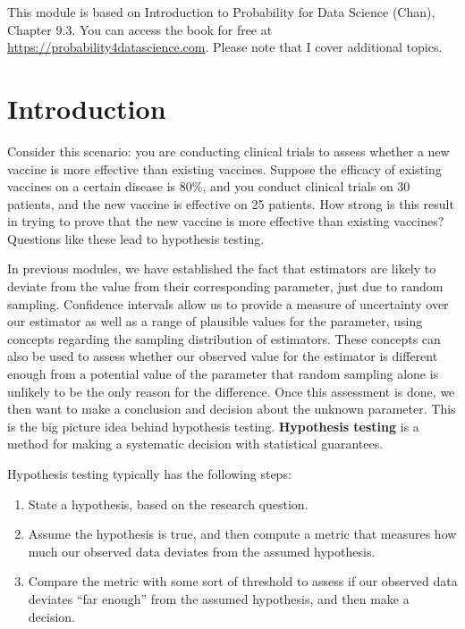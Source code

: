 \documentclass[
]{book}
\providecommand{\tightlist}{%
  \setlength{\itemsep}{0pt}\setlength{\parskip}{0pt}}
\begin{document}
This module is based on Introduction to Probability for Data Science (Chan), Chapter 9.3. You can access the book for free at \url{https://probability4datascience.com}. Please note that I cover additional topics.

\hypertarget{introduction-5}{%
\section{Introduction}\label{introduction-5}}

Consider this scenario: you are conducting clinical trials to assess whether a new vaccine is more effective than existing vaccines. Suppose the efficacy of existing vaccines on a certain disease is 80\%, and you conduct clinical trials on 30 patients, and the new vaccine is effective on 25 patients. How strong is this result in trying to prove that the new vaccine is more effective than existing vaccines? Questions like these lead to hypothesis testing.

In previous modules, we have established the fact that estimators are likely to deviate from the value from their corresponding parameter, just due to random sampling. Confidence intervals allow us to provide a measure of uncertainty over our estimator as well as a range of plausible values for the parameter, using concepts regarding the sampling distribution of estimators. These concepts can also be used to assess whether our observed value for the estimator is different enough from a potential value of the parameter that random sampling alone is unlikely to be the only reason for the difference. Once this assessment is done, we then want to make a conclusion and decision about the unknown parameter. This is the big picture idea behind hypothesis testing. \textbf{Hypothesis testing} is a method for making a systematic decision with statistical guarantees.

Hypothesis testing typically has the following steps:

\begin{enumerate}
\def\labelenumi{\arabic{enumi}.}
\tightlist
\item
  State a hypothesis, based on the research question.
\item
  Assume the hypothesis is true, and then compute a metric that measures how much our observed data deviates from the assumed hypothesis.
\item
  Compare the metric with some sort of threshold to assess if our observed data deviates ``far enough'' from the assumed hypothesis, and then make a decision.
\end{enumerate}
\end{document}
